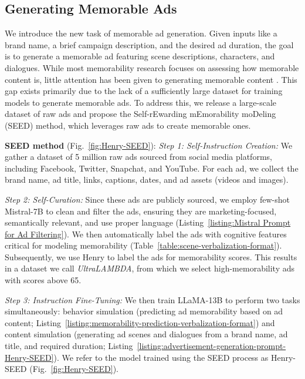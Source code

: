 \subsection{Generating Memorable Ads}
\label{sec:Generating Memorable Ads}






We introduce the new task of memorable ad generation. Given inputs like a brand name, a brief campaign description, and the desired ad duration, the goal is to generate a memorable ad featuring scene descriptions, characters, and dialogues. While most memorability research focuses on assessing how memorable content is, little attention has been given to generating memorable content \cite{danescu-niculescu-mizil-etal-2012-hello,khosla2013modifying,siarohin2017make,goetschalckx2019ganalyze,kyle2022modulating}. This gap exists primarily due to the lack of a sufficiently large dataset for training models to generate memorable ads. To address this, we release a large-scale dataset of raw ads and propose the Self-rEwarding mEmorability moDeling (SEED) method, which leverages raw ads to create memorable ones.

\textbf{SEED method} (Fig.~\ref{fig:Henry-SEED}):  \textit{Step 1: Self-Instruction Creation:} We gather a dataset of 5 million raw ads sourced from social media platforms, including Facebook, Twitter, Snapchat, and YouTube. For each ad, we collect the brand name, ad title, links, captions, dates, and ad assets (videos and images).


\textit{Step 2: Self-Curation:} Since these ads are publicly sourced, we employ few-shot Mistral-7B \cite{jiang2023mistral} to clean and filter the ads, ensuring they are marketing-focused, semantically relevant, and use proper language (Listing~\ref{listing:Mistral Prompt for Ad Filtering}). We then automatically label the ads with cognitive features critical for modeling memorability (Table~\ref{table:scene-verbalization-format}). %
Subsequently, we use Henry to label the ads for memorability scores. This results in a dataset we call \textit{UltraLAMBDA}, from which we select high-memorability ads with scores above 65.


\textit{Step 3: Instruction Fine-Tuning:} We then train LLaMA-13B to perform two tasks simultaneously: behavior simulation (predicting ad memorability based on ad content; Listing~\ref{listing:memorability-prediction-verbalization-format}) and content simulation (generating ad scenes and dialogues from a brand name, ad title, and required duration; Listing~\ref{listing:advertisement-generation-prompt-Henry-SEED}). We refer to the model trained using the SEED process as Henry-SEED (Fig.~\ref{fig:Henry-SEED}).


